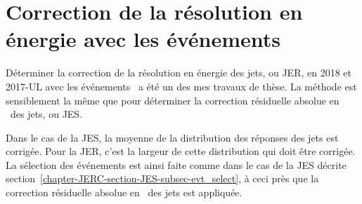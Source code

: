 \section{Correction de la résolution en énergie avec les événements \Gjets}\label{chapter-JERC-section-JER}
Déterminer la correction de la résolution en énergie des jets, ou JER, en 2018 et 2017-UL avec les événements \Gjets\ a été un des mes travaux de thèse.
La méthode est sensiblement la même que pour déterminer la correction résiduelle absolue en \pT\ des jets, ou JES.
\par Dans le cas de la JES, la moyenne de la distribution des réponses des jets est corrigée. Pour la JER, c'est la largeur de cette distribution qui doit être corrigée.
La sélection des événements est ainsi faite comme dans le cas de la JES décrite section~\ref{chapter-JERC-section-JES-subsec-evt_select}, à ceci près que la correction résiduelle absolue en \pT\ des jets est appliquée.
